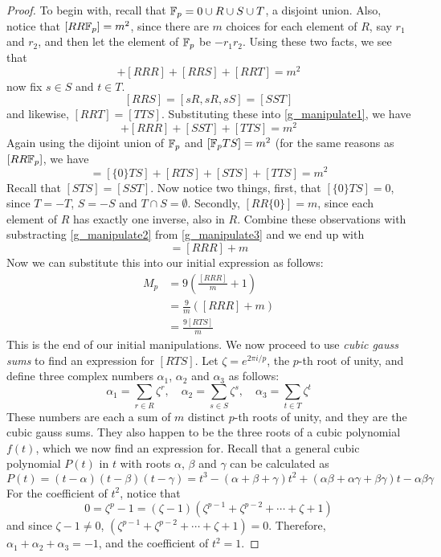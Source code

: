 \begin{proof}
To begin with, recall that $\mathbb{F}_p = {0} \cup R \cup S \cup T$, a disjoint union. Also, notice that $[RR\mathbb{F}_p] = m^2$, since there are $m$ choices for each element of $R$, say $r_1$ and $r_2$, and then let the element of $\mathbb{F}_p$ be $-r_1r_2$. Using these two facts, we see that
\begin{equation}
	[RR\{0\}] + [RRR] + [RRS] + [RRT] = m^2 \label{g_manipulate1}
\end{equation}
now fix $s \in S$ and $t \in T$.
$$[RRS] = [sR, sR, sS] = [SST]$$
and likewise, $[RRT] = [TTS]$. Substituting these into \eqref{g_manipulate1}, we have
\begin{equation}
	[RR\{0\}] +[RRR] + [SST] + [TTS] = m^2 \label{g_manipulate2}
\end{equation}
Again using the dijoint union of $\mathbb{F}_p$ and $[\mathbb{F}_p TS] = m^2$ (for the same reasons as $[RR\mathbb{F}_p]$, we have
\begin{equation}
	[\fp TS] = [\{0\}TS] + [RTS] + [STS] + [TTS] = m^2 \label{g_manipulate3}
\end{equation}
Recall that $[STS] = [SST]$. Now notice two things, first, that $[\{0\}TS] = 0$, since $T = -T$, $S = -S$ and $T \cap S = \emptyset$. Secondly, $[RR\{0\}] = m$, since each element of $R$ has exactly one inverse, also in $R$. Combine these observations with substracting \eqref{g_manipulate2} from \eqref{g_manipulate3} and we end up with
\begin{equation*}
	[RTS] = [RRR] + m
\end{equation*}
Now we can substitute this into our initial expression as follows:
\begin{align*}
	M_p &= 9\left(\frac{[RRR]}{m}+1\right)\\
	    &= \frac{9}{m}\left([RRR] + m\right)\\
	    &= \frac{9[RTS]}{m}
\end{align*}
This is the end of our initial manipulations. We now proceed to use \emph{cubic gauss sums} to find an expression for $[RTS]$. Let $\zeta = e^{2\pi i/p}$, the $p$-th root of unity, and define three complex numbers $\alpha_1$, $\alpha_2$ and $\alpha_3$ as follows:
$$\alpha_1 = \sum_{r\in R} \zeta^r,\quad \alpha_2 = \sum_{s\in S} \zeta^s,\quad \alpha_3 = \sum_{t\in T} \zeta^t$$
These numbers are each a sum of $m$ distinct $p$-th roots of unity, and they are the cubic gauss sums. They also happen to be the three roots of a cubic polynomial $f(t)$, which we now find an expression for. Recall that a general cubic polynomial $P(t)$ in $t$ with roots $\alpha$, $\beta$ and $\gamma$ can be calculated as
$$ P(t) = (t-\alpha)(t-\beta)(t-\gamma) = t^3 - (\alpha + \beta + \gamma)t^2 + (\alpha \beta + \alpha \gamma + \beta \gamma)t - \alpha \beta \gamma $$
For the coefficient of $t^2$, notice that
$$ 0 = \zeta^p -1 = (\zeta - 1)(\zeta^{p-1}+\zeta^{p-2}+\cdots+\zeta+1) $$
and since $\zeta-1 \neq 0$, $(\zeta^{p-1}+\zeta^{p-2}+\cdots+\zeta+1) = 0$. Therefore, $\alpha_1 + \alpha_2 + \alpha_3 = -1$, and the coefficient of $t^2 = 1$.


\end{proof}
